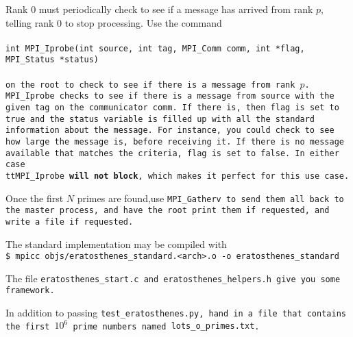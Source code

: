 \documentclass{article}
\begin{document}
\begin{enumerate}
Rank 0 must periodically check to see if a message has arrived from
rank $p$, telling rank 0 to stop processing.  Use the command \\
\\
\tt{int MPI\_Iprobe(int source, int tag, MPI\_Comm comm, int *flag,
  MPI\_Status *status)}\\
\\
on the root to check to see if there is a message from rank $p$.  \tt{MPI\_Iprobe}
checks to see if there is a message from \tt{source} with the given
\tt{tag} on the communicator \tt{comm}.  If there is, then \tt{flag}
is set to true and the \tt{status} variable is filled up with all the
standard information about the message.  For instance, you could check
to see how large the message is, before receiving it.  If there is no
message available that matches the criteria, \tt{flag} is set to
false.  In either case \\tt{MPI\_Iprobe} \textbf{will not block},
which makes it perfect for this use case. 
  
Once the first $N$ primes are found,use \tt{MPI\_Gatherv} to send them
all back to the master process, and have the root print them if
requested, and write a file if requested. 

The standard implementation may be compiled with \\
\tt{\$ mpicc objs/eratosthenes\_standard.<arch>.o -o eratosthenes\_standard}

The file \tt{eratosthenes\_start.c} and \tt{eratosthenes\_helpers.h}
give you some framework. 

In addition to passing \tt{test\_eratosthenes.py}, hand in a file that
contains the first $10^6$ prime numbers named \tt{lots\_o\_primes.txt}. 


\end{enumerate}

\newpage

\end{document}
